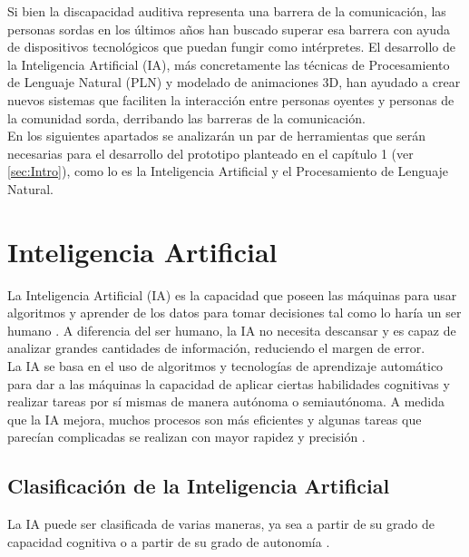 Si bien la discapacidad auditiva representa una barrera de la comunicación, las personas sordas en los últimos años han buscado superar esa barrera con ayuda de dispositivos tecnológicos que puedan fungir como intérpretes. El desarrollo de la Inteligencia Artificial (IA), más concretamente las técnicas de Procesamiento de Lenguaje Natural (PLN) y modelado de animaciones 3D, han ayudado a crear nuevos sistemas que faciliten la interacción entre personas oyentes y personas de la comunidad sorda, derribando las barreras de la comunicación.\\

En los siguientes apartados se analizarán un par de herramientas que serán necesarias para el desarrollo del prototipo planteado en el capítulo 1 (ver \autoref{sec:Intro}), como lo es la Inteligencia Artificial y el Procesamiento de Lenguaje Natural.\\

\section{Inteligencia Artificial}
La Inteligencia Artificial (IA) es la capacidad que poseen las máquinas para usar algoritmos y aprender de los datos para tomar decisiones tal como lo haría un ser humano \cite{ref41}. A diferencia del ser humano, la IA no necesita descansar y es capaz de analizar grandes cantidades de información, reduciendo el margen de error.\\

La IA se basa en el uso de algoritmos y tecnologías de aprendizaje automático para dar a las máquinas la capacidad de aplicar ciertas habilidades cognitivas y realizar tareas por sí mismas de manera autónoma o semiautónoma. A medida que la IA mejora, muchos procesos son más eficientes y algunas tareas que parecían complicadas se realizan con mayor rapidez y precisión \cite{ref42}.\\

\newpage
\subsection{Clasificación de la Inteligencia Artificial}
La IA puede ser clasificada de varias maneras, ya sea a partir de su grado de capacidad cognitiva o a partir de su grado de autonomía \cite{ref42}.\\

